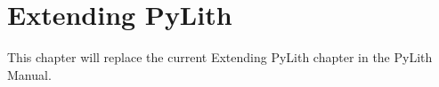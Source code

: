 \chapter{Extending PyLith}
\label{cha:developer}

This chapter will replace the current Extending PyLith chapter in the
PyLith Manual.







